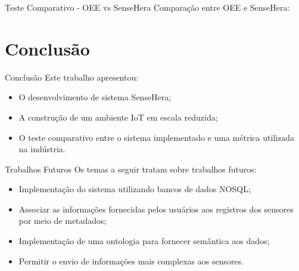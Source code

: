 \documentclass{beamer}
\begin{document}
    \begin{frame}{Teste Comparativo - OEE vs SenseHera}
      \quad Comparação entre OEE e SenseHera:
      \begin{center}
      \end{center}
    \end{frame}
  \section{Conclusão}
    \begin{frame}{ Conclusão }
      \quad Este trabalho apresentou:
      \begin{itemize}
        \item O desenvolvimento de sistema SenseHera;
        \item A construção de um ambiente IoT em escala reduzida;
        \item O teste comparativo entre o sistema implementado e uma métrica utilizada na indústria.
      \end{itemize}
    \end{frame}

    \begin{frame}{Trabalhos Futuros}
      \quad Os temas a seguir tratam sobre trabalhos futuros:
      \begin{itemize}
        \item Implementação do sistema utilizando bancos de dados NOSQL;
        \item Associar as informações fornecidas pelos usuários aos registros dos sensores por meio de metadados;
        \item Implementação de uma ontologia para fornecer semântica aos dados;
        \item Permitir o envio de informações mais complexas aos sensores.
      \end{itemize}

    \end{frame}
\end{document}
